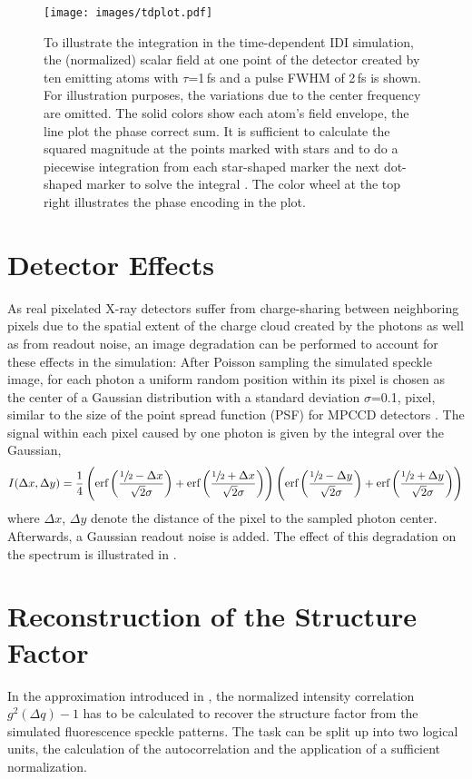 \begin{figure}
	\centering
	\texttt{[image: images/tdplot.pdf]}
	\caption[Integration in time0dependent IDI simulation]{To illustrate the integration in the time-dependent IDI simulation, the (normalized) scalar field at one point of the detector created by ten emitting atoms with $\tau$=1\,fs and a pulse FWHM of 2\,fs is shown. For illustration purposes, the variations due to the center frequency are omitted. The solid colors show each atom's field envelope, the line plot the phase correct sum. It is sufficient to calculate the squared magnitude at the points marked with stars and to do a piecewise integration from each star-shaped marker the next dot-shaped marker to solve the integral . The color wheel at the top right illustrates the phase encoding in the plot.}
	\label{fig:tdplot}
\end{figure}

\section{Detector Effects}
\label{sec:chargesharing}
As real pixelated X-ray detectors suffer from charge-sharing between neighboring pixels due to the spatial extent of the charge cloud created by the photons as well as from readout noise, an image degradation can be performed to account for these effects in the simulation: After Poisson sampling the simulated speckle image, for each photon a uniform random position within its pixel is chosen as the center of a Gaussian distribution with a  standard deviation $\sigma$=0.1, pixel, similar to the size of the point spread function (PSF) for MPCCD detectors \cite{mpccd}.
The signal within each pixel caused by one photon is given by the integral over the Gaussian,
\begin{equation*}
	I(\Delta x,\Delta y)=\frac{1}{4} \left(\text{erf}\left(\frac{\sfrac{1}{2}-\Delta x}{\sqrt{2}
		\sigma}\right)+\text{erf}\left(\frac{\sfrac{1}{2}+\Delta x}{\sqrt{2} \sigma}\right)\right) \left(\text{erf}\left(\frac{\sfrac{1}{2}-\Delta y}{\sqrt{2}
		\sigma}\right)+\text{erf}\left(\frac{\sfrac{1}{2}+\Delta y}{\sqrt{2} \sigma}\right)\right)
\end{equation*}
 where $\Delta x$, $\Delta y$ denote the distance of the pixel to the sampled photon center. Afterwards, a Gaussian readout noise is added. The effect of this degradation on the spectrum is illustrated in .

\section{Reconstruction of the Structure Factor}
In the approximation introduced  in , the normalized intensity correlation $g^2(\Delta q)-1$ has to be calculated to recover the structure factor from the simulated fluorescence speckle patterns. The task can be split up into two logical units, the calculation of the autocorrelation and the application of a sufficient normalization.

